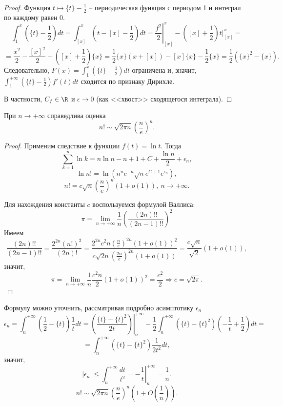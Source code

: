 \begin{proof}
    Функция $t \mapsto \{t\} - \frac{1}{2}$ -- периодическая функция с периодом 1 и интеграл по каждому равен 0.
    \[\int_{1}^{x}\left(\{t\} - \frac{1}{2}\right)dt = \int_{[x]}^{x}\left(t - [x] - \frac{1}{2}\right)dt = \left.\frac{f^{2}}{2}\right|_{[x]}^{x} - \left([x] + \frac{1}{2}\right)t\left.\right|_{[x]}^{x} = \]
    \[ = \frac{x^{2}}{2} - \frac{[x]^{2}}{2} - \left([x] + \frac{1}{2}\right)\{x\} = \frac{1}{2}\{x\}(x + [x]) - [x]\{x\} - \frac{1}{2}\{x\} = \frac{1}{2}(\{x\}^{2} - \{x\}).\]
    Следовательно, $F(x) = \int_{1}^{x}(\{t\} - \frac{1}{2})dt$ ограничена и, значит, $\int_{1}^{+\infty}(\{t\} - \frac{1}{2})f'(t)dt$ сходится по признаку Дирихле. 

    В частности, $C_{f} \in \R$ и $\epsilon \to 0$ (как <<хвост>> сходящегося интеграла).
\end{proof}

\begin{example}
    При $n \to +\infty$ справедлива оценка
    \[n! \sim \sqrt{2\pi n}\left(\frac{n}{e}\right)^{n}.\]
\end{example}

\begin{proof}
    Применим следствие к функции $f(t) = \ln t$. Тогда
    \[\sum_{k = 1}^{n} \ln k = n \ln n - n + 1 + C + \frac{\ln n}{2} + \epsilon_{n},\]
    \[\ln n! = \ln(n^{n}e^{-n}\sqrt{n}e^{C + 1}e^{\epsilon_{n}}),\]
    \[n! = c\sqrt{n}\left(\frac{n}{e}\right)^{n}(1 + o(1)), \ n \to +\infty.\]

    Для нахождения константы $c$ воспользуемся формулой Валлиса:
    \[\pi = \lim_{n \to +\infty}\frac{1}{n}\left(\frac{(2n)!!}{(2n-1)!!}\right)^{2}\]
    Имеем 
    \[\frac{(2n)!!}{(2n-1)!!} = \frac{2^{2n}(n!)^{2}}{(2n)!} = \frac{2^{2n}c^{2}n\left(\frac{n}{e}\right)^{2n}(1 + o(1))^{2}}{c \sqrt{2n}\left(\frac{2n}{e}\right)^{2n}(1 + o(1))} = \frac{c\sqrt{n}}{\sqrt{2}}(1 + o(1)),\]
    значит,
    \[\pi = \lim_{n \to +\infty}\frac{1}{n}\frac{c^{2}n}{2}(1 + o(1))^{2} = \frac{c^{2}}{2} \Rightarrow c = \sqrt{2\pi}.\]
\end{proof}

\begin{note}
    Формулу можно уточнить, рассматривая подробно асимптотику $\epsilon_{n}$
    \[\epsilon_{n}=\int_{n}^{+\infty}\left(\frac{1}{2} - \{t\}\right)\frac{1}{t}dt = \left.\left(\frac{\{t\} - \{t\}^{2}}{2t}\right)\right|_{n}^{+\infty} - \frac{1}{2}\int_{n}^{+\infty}(\{t\} - \{t\}^{2})\left(-\frac{1}{t} + \frac{1}{2}\right)dt =\]
    \[= \int_{n}^{+\infty}(\{t\} - \{t\}^{2})\frac{1}{2t^{2}}dt,\]
    значит,
    \[|\epsilon_{n}| \leq \int_{n}^{+\infty}\frac{dt}{t^{2}} = -\left.\frac{1}{t}\right|_{n}^{+\infty} = \frac{1}{n}.\]
    \[n! \sim \sqrt{2\pi n}\left(\frac{n}{e}\right)^{n}\left(1 + O\left(\frac{1}{n}\right)\right).\]
\end{note}

